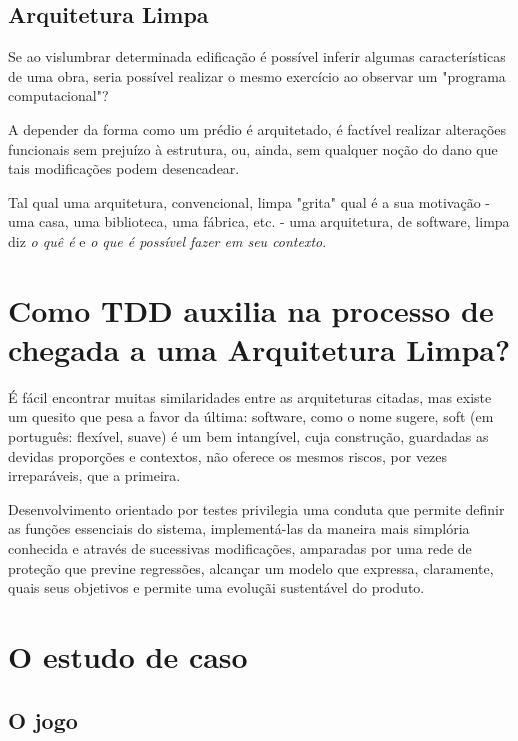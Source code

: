 \documentclass[12pt,a4paper,oneside,english,brazil]{article}
\begin{document}
    \subsection{Arquitetura Limpa}

      Se ao vislumbrar determinada edificação é possível inferir algumas
      características de uma obra, seria possível realizar o mesmo exercício ao
      observar um "programa computacional"?

      A depender da forma como um prédio é arquitetado, é factível realizar
      alterações funcionais sem prejuízo à estrutura, ou, ainda, sem qualquer
      noção do dano que tais modificações podem desencadear.

      Tal qual uma arquitetura, convencional, limpa "grita"\cite[p. 196]{
      Martin2018} qual é a sua motivação - uma casa, uma biblioteca, uma fábrica,
      etc. - uma arquitetura, de software,  limpa diz \emph{o quê é} e \emph{o
      que é possível fazer em seu contexto}.

  \section{Como TDD auxilia na processo de chegada a uma Arquitetura Limpa?}

    É fácil encontrar muitas similaridades entre as arquiteturas citadas, mas
    existe um quesito que pesa a favor da última: software, como o nome sugere,
    soft (em português: flexível, suave) é um bem intangível, cuja construção,
    guardadas as devidas proporções e contextos, não oferece os mesmos riscos,
    por vezes irreparáveis, que a primeira.

    Desenvolvimento orientado por testes privilegia uma conduta que permite
    definir as funções essenciais do sistema, implementá-las da maneira mais
    simplória conhecida e através de sucessivas modificações, amparadas por uma
    rede de proteção que previne regressões, alcançar um modelo que expressa,
    claramente, quais seus objetivos e permite uma evoluçãi sustentável do
    produto.

  \section{O estudo de caso}

    \subsection{O jogo}
\end{document}
